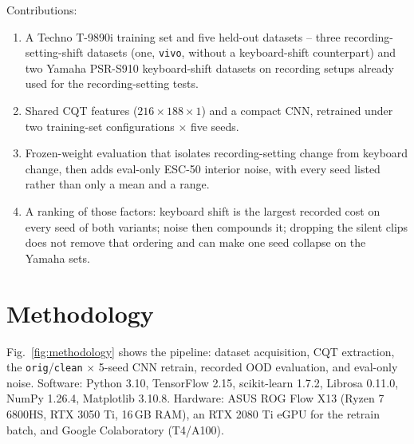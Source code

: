 \documentclass[pdflatex,sn-mathphys-num,iicol]{sn-jnl}
\theoremstyle{thmstyleone}
\theoremstyle{thmstyletwo}
\theoremstyle{thmstylethree}
\begin{document}
Contributions:
\begin{enumerate}[1.]
\item A Techno T-9890i training set and five held-out datasets -- three recording-setting-shift datasets (one, \texttt{vivo}, without a keyboard-shift counterpart) and two Yamaha PSR-S910 keyboard-shift datasets on recording setups already used for the recording-setting tests.
\item Shared CQT features ($216\times188\times1$) and a compact CNN, retrained under two training-set configurations $\times$ five seeds.
\item Frozen-weight evaluation that isolates recording-setting change from keyboard change, then adds eval-only ESC-50 interior noise, with every seed listed rather than only a mean and a range.
\item A ranking of those factors: keyboard shift is the largest recorded cost on every seed of both variants; noise then compounds it; dropping the silent clips does not remove that ordering and can make one seed collapse on the Yamaha sets.
\end{enumerate}

\section{Methodology}\label{sec3}

Fig.~\ref{fig:methodology} shows the pipeline: dataset acquisition, CQT extraction, the \texttt{orig}/\texttt{clean} $\times$ 5-seed CNN retrain, recorded OOD evaluation, and eval-only noise. Software: Python 3.10, TensorFlow 2.15, scikit-learn 1.7.2, Librosa 0.11.0, NumPy 1.26.4, Matplotlib 3.10.8. Hardware: ASUS ROG Flow X13 (Ryzen 7 6800HS, RTX 3050 Ti, 16\,GB RAM), an RTX 2080 Ti eGPU for the retrain batch, and Google Colaboratory (T4/A100).
\end{document}
